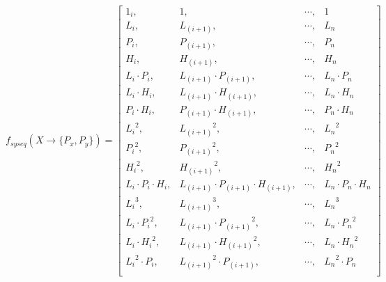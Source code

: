 \documentclass[10pt]{report}
\begin{document}
\begin{equation}
f_{syseq}\left( X \rightarrow \{ P_x, P_y \} \right) = 
    \begin{bmatrix}
1_i,                        & 1        ,                                    & \cdots, & 1                          \\[4pt]
L_i,                        & L_{(i+1)},                                    & \cdots, & L_n                        \\[4pt]
P_i,                        & P_{(i+1)},                                    & \cdots, & P_n                        \\[4pt]
H_i,                        & H_{(i+1)},                                    & \cdots, & H_n                        \\[4pt]
L_i \cdot P_i,              & L_{(i+1)} \cdot P_{(i+1)},                    & \cdots, & L_n \cdot P_n              \\[4pt]
L_i \cdot H_i,              & L_{(i+1)} \cdot H_{(i+1)},                    & \cdots, & L_n \cdot H_n              \\[4pt]
P_i \cdot H_i,              & P_{(i+1)} \cdot H_{(i+1)},                    & \cdots, & P_n \cdot H_n              \\[4pt]
{L_i}^2,                    & {L_{(i+1)}}^2,                                & \cdots, & {L_n}^2                    \\[4pt]
{P_i}^2,                    & {P_{(i+1)}}^2,                                & \cdots, & {P_n}^2                    \\[4pt]
{H_i}^2,                    & {H_{(i+1)}}^2,                                & \cdots, & {H_n}^2                    \\[4pt]
L_i \cdot P_i \cdot H_i,    & L_{(i+1)} \cdot P_{(i+1)} \cdot H_{(i+1)},    & \cdots, & L_n \cdot P_n \cdot H_n    \\[4pt]
{L_i}^3,                    & {L_{(i+1)}}^3,                                & \cdots, & {L_n}^3                    \\[4pt]
L_i \cdot {P_i}^2,          & L_{(i+1)} \cdot {P_{(i+1)}}^2,                & \cdots, & L_n \cdot {P_n}^2          \\[4pt]
L_i \cdot {H_i}^2,          & L_{(i+1)} \cdot {H_{(i+1)}}^2,                & \cdots, & L_n \cdot {H_n}^2          \\[4pt]
{L_i}^2 \cdot P_i,          & {L_{(i+1)}}^2 \cdot P_{(i+1)},                & \cdots, & {L_n}^2 \cdot P_n          \\[4pt]

\end{bmatrix}
\end{equation}
\end{document}
